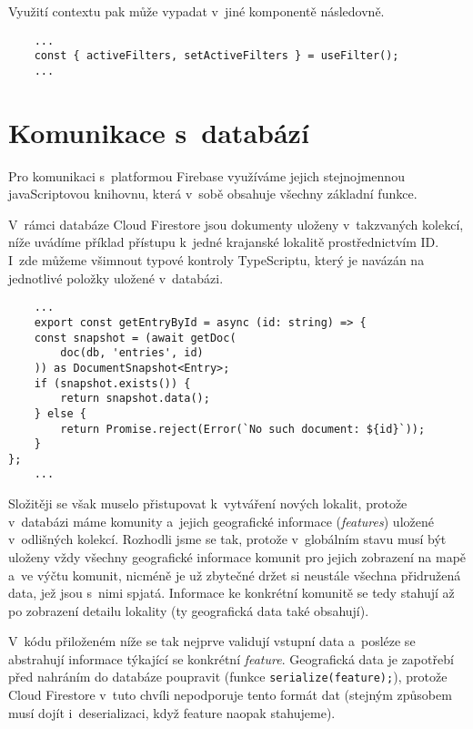 Využití contextu pak může vypadat v~jiné komponentě následovně.

\begin{verbatim}
    ...
    const { activeFilters, setActiveFilters } = useFilter(); 
    ...
    \end{verbatim}

\hypertarget{komunikace-s-databuxe1zuxed}{%
\section{Komunikace s~databází}\label{komunikace-s-databuxe1zuxed}}

Pro komunikaci s~platformou Firebase využíváme jejich stejnojmennou javaScriptovou knihovnu, která v~sobě obsahuje všechny základní funkce.

V~rámci databáze Cloud Firestore jsou dokumenty uloženy v~takzvaných kolekcí, níže uvádíme příklad přístupu k~jedné krajanské lokalitě prostřednictvím ID. I~zde můžeme všimnout typové kontroly TypeScriptu, který je navázán na jednotlivé položky uložené v~databázi.

\begin{verbatim}
    ...
    export const getEntryById = async (id: string) => {
    const snapshot = (await getDoc(
        doc(db, 'entries', id)
    )) as DocumentSnapshot<Entry>;
    if (snapshot.exists()) {
        return snapshot.data();
    } else {
        return Promise.reject(Error(`No such document: ${id}`));
    }
};
    ...
    \end{verbatim}

Složitěji se však muselo přistupovat k~vytváření nových lokalit, protože v~databázi máme komunity a~jejich geografické informace (\emph{features}) uložené v~odlišných kolekcí. Rozhodli jsme se tak, protože v~globálním stavu musí být uloženy vždy všechny geografické informace komunit pro jejich zobrazení na mapě a~ve výčtu komunit, nicméně je už zbytečné držet si neustále všechna přidružená data, jež jsou s~nimi spjatá. Informace ke konkrétní komunitě se tedy stahují až po zobrazení detailu lokality (ty geografická data také obsahují).

V~kódu přiloženém níže se tak nejprve validují vstupní data a~posléze se abstrahují informace týkající se konkrétní \emph{feature}. Geografická data je zapotřebí před nahráním do databáze poupravit (funkce \verb|serialize(feature);|), protože Cloud Firestore v~tuto chvíli nepodporuje tento formát dat (stejným způsobem musí dojít i~deserializaci, když feature naopak stahujeme).

